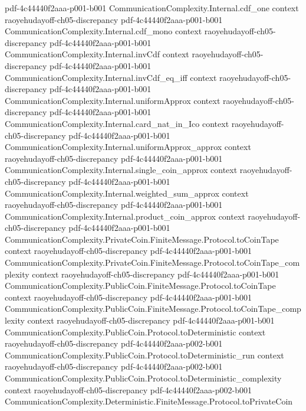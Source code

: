 \begin{theorem}
  {pdf-4c44440f2aaa-p001-b001}
\proofstep
  {CommunicationComplexity.Internal.cdf_one}
  {context}
  {raoyehudayoff-ch05-discrepancy}
  {pdf-4c44440f2aaa-p001-b001}
\proofstep
  {CommunicationComplexity.Internal.cdf_mono}
  {context}
  {raoyehudayoff-ch05-discrepancy}
  {pdf-4c44440f2aaa-p001-b001}
\proofstep
  {CommunicationComplexity.Internal.invCdf}
  {context}
  {raoyehudayoff-ch05-discrepancy}
  {pdf-4c44440f2aaa-p001-b001}
\proofstep
  {CommunicationComplexity.Internal.invCdf_eq_iff}
  {context}
  {raoyehudayoff-ch05-discrepancy}
  {pdf-4c44440f2aaa-p001-b001}
\proofstep
  {CommunicationComplexity.Internal.uniformApprox}
  {context}
  {raoyehudayoff-ch05-discrepancy}
  {pdf-4c44440f2aaa-p001-b001}
\proofstep
  {CommunicationComplexity.Internal.card_nat_in_Ico}
  {context}
  {raoyehudayoff-ch05-discrepancy}
  {pdf-4c44440f2aaa-p001-b001}
\proofstep
  {CommunicationComplexity.Internal.uniformApprox_approx}
  {context}
  {raoyehudayoff-ch05-discrepancy}
  {pdf-4c44440f2aaa-p001-b001}
\proofstep
  {CommunicationComplexity.Internal.single_coin_approx}
  {context}
  {raoyehudayoff-ch05-discrepancy}
  {pdf-4c44440f2aaa-p001-b001}
\proofstep
  {CommunicationComplexity.Internal.weighted_sum_approx}
  {context}
  {raoyehudayoff-ch05-discrepancy}
  {pdf-4c44440f2aaa-p001-b001}
\proofstep
  {CommunicationComplexity.Internal.product_coin_approx}
  {context}
  {raoyehudayoff-ch05-discrepancy}
  {pdf-4c44440f2aaa-p001-b001}
\proofstep
  {CommunicationComplexity.PrivateCoin.FiniteMessage.Protocol.toCoinTape}
  {context}
  {raoyehudayoff-ch05-discrepancy}
  {pdf-4c44440f2aaa-p001-b001}
\proofstep
  {CommunicationComplexity.PrivateCoin.FiniteMessage.Protocol.toCoinTape_complexity}
  {context}
  {raoyehudayoff-ch05-discrepancy}
  {pdf-4c44440f2aaa-p001-b001}
\proofstep
  {CommunicationComplexity.PublicCoin.FiniteMessage.Protocol.toCoinTape}
  {context}
  {raoyehudayoff-ch05-discrepancy}
  {pdf-4c44440f2aaa-p001-b001}
\proofstep
  {CommunicationComplexity.PublicCoin.FiniteMessage.Protocol.toCoinTape_complexity}
  {context}
  {raoyehudayoff-ch05-discrepancy}
  {pdf-4c44440f2aaa-p001-b001}
\proofstep
  {CommunicationComplexity.PublicCoin.Protocol.toDeterministic}
  {context}
  {raoyehudayoff-ch05-discrepancy}
  {pdf-4c44440f2aaa-p002-b001}
\proofstep
  {CommunicationComplexity.PublicCoin.Protocol.toDeterministic_run}
  {context}
  {raoyehudayoff-ch05-discrepancy}
  {pdf-4c44440f2aaa-p002-b001}
\proofstep
  {CommunicationComplexity.PublicCoin.Protocol.toDeterministic_complexity}
  {context}
  {raoyehudayoff-ch05-discrepancy}
  {pdf-4c44440f2aaa-p002-b001}
\proofstep
  {CommunicationComplexity.Deterministic.FiniteMessage.Protocol.toPrivateCoin}

\end{theorem}
